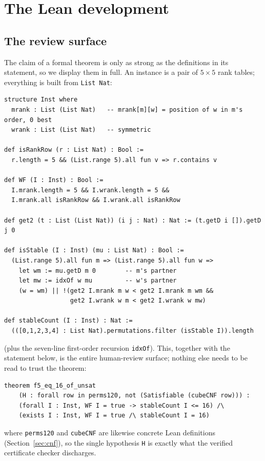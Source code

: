 \documentclass[11pt]{article}
\begin{document}
\section{The Lean development}

\subsection{The review surface}

The claim of a formal theorem is only as strong as the definitions in its statement, so we
display them in full. An instance is a pair of $5\times 5$ rank tables; everything is built
from \texttt{List Nat}:

\begin{verbatim}
structure Inst where
  mrank : List (List Nat)   -- mrank[m][w] = position of w in m's order, 0 best
  wrank : List (List Nat)   -- symmetric

def isRankRow (r : List Nat) : Bool :=
  r.length = 5 && (List.range 5).all fun v => r.contains v

def WF (I : Inst) : Bool :=
  I.mrank.length = 5 && I.wrank.length = 5 &&
  I.mrank.all isRankRow && I.wrank.all isRankRow

def get2 (t : List (List Nat)) (i j : Nat) : Nat := (t.getD i []).getD j 0

def isStable (I : Inst) (mu : List Nat) : Bool :=
  (List.range 5).all fun m => (List.range 5).all fun w =>
    let wm := mu.getD m 0        -- m's partner
    let mw := idxOf w mu         -- w's partner
    (w = wm) || !(get2 I.mrank m w < get2 I.mrank m wm &&
                  get2 I.wrank w m < get2 I.wrank w mw)

def stableCount (I : Inst) : Nat :=
  (([0,1,2,3,4] : List Nat).permutations.filter (isStable I)).length
\end{verbatim}

\noindent (plus the seven-line first-order recursion \texttt{idxOf}). This, together with
the statement below, is the entire human-review surface; nothing else needs to be read to
trust the theorem:

\begin{verbatim}
theorem f5_eq_16_of_unsat
    (H : forall row in perms120, not (Satisfiable (cubeCNF row))) :
    (forall I : Inst, WF I = true -> stableCount I <= 16) /\
    (exists I : Inst, WF I = true /\ stableCount I = 16)
\end{verbatim}

\noindent where \texttt{perms120} and \texttt{cubeCNF} are likewise concrete Lean
definitions (Section~\ref{sec:cnf}), so the single hypothesis \texttt{H} is exactly what
the verified certificate checker discharges.
\end{document}
